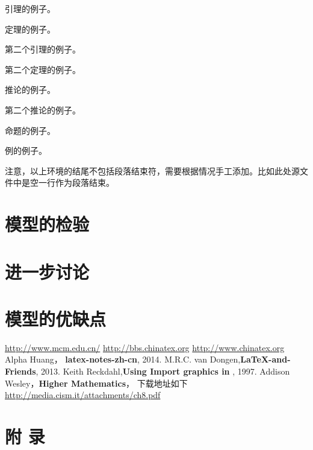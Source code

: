 \documentclass{cumcmart}
\begin{document}
\begin{lemma}
  引理的例子。
\end{lemma}

\begin{theorem}
  定理的例子。
\end{theorem}

\begin{lemma}
  第二个引理的例子。
\end{lemma}

\begin{theorem}
  第二个定理的例子。
\end{theorem}

\begin{corollary}
  推论的例子。
\end{corollary}

\begin{corollary}
  第二个推论的例子。
\end{corollary}

\begin{proposition}
  命题的例子。
\end{proposition}

\begin{example}
  例的例子。
\end{example}

    注意，以上环境的结尾不包括段落结束符，需要根据情况手工添加。比如此处源文件中是空一行作为段落结束。
\section{模型的检验}
\section{进一步讨论}
\section{模型的优缺点}













\begin{thebibliography}{10}
 \url{http://www.mcm.edu.cn/}
 \url{http://bbs.chinatex.org}
 \url{http://www.chinatex.org}
 Alpha Huang， \textbf{latex-notes-zh-cn}, 2014.
M.R.C. van Dongen,\textbf{\LaTeX-and-Friends}, 2013.
Keith Reckdahl,\textbf{Using Import graphics in \LaTeXe}, 1997.
Addison Wesley，\textbf{Higher Mathematics}， 下载地址如下\\ \url{http://media.cism.it/attachments/ch8.pdf}
\end{thebibliography}


\newpage
\appendix
\section*{附 \quad 录}
\end{document}

